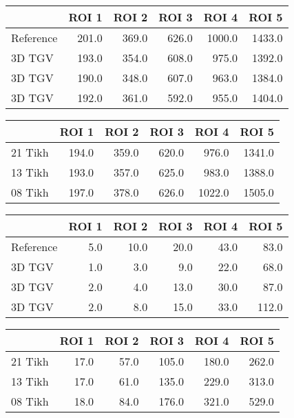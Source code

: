 \begin{tabular}{lrrrrr}
\toprule
{} &  ROI 1 &  ROI 2 &  ROI 3 &   ROI 4 &   ROI 5 \\
\midrule
Reference &  201.0 &  369.0 &  626.0 &  1000.0 &  1433.0 \\
3D TGV    &  193.0 &  354.0 &  608.0 &   975.0 &  1392.0 \\
3D TGV    &  190.0 &  348.0 &  607.0 &   963.0 &  1384.0 \\
3D TGV    &  192.0 &  361.0 &  592.0 &   955.0 &  1404.0 \\
\bottomrule
\end{tabular}
\begin{tabular}{lrrrrr}
\toprule
{} &  ROI 1 &  ROI 2 &  ROI 3 &   ROI 4 &   ROI 5 \\
\midrule
21 Tikh &  194.0 &  359.0 &  620.0 &   976.0 &  1341.0 \\
13 Tikh &  193.0 &  357.0 &  625.0 &   983.0 &  1388.0 \\
08 Tikh &  197.0 &  378.0 &  626.0 &  1022.0 &  1505.0 \\
\bottomrule
\end{tabular}
\begin{tabular}{lrrrrr}
\toprule
{} &  ROI 1 &  ROI 2 &  ROI 3 &  ROI 4 &  ROI 5 \\
\midrule
Reference &    5.0 &   10.0 &   20.0 &   43.0 &   83.0 \\
3D TGV    &    1.0 &    3.0 &    9.0 &   22.0 &   68.0 \\
3D TGV    &    2.0 &    4.0 &   13.0 &   30.0 &   87.0 \\
3D TGV    &    2.0 &    8.0 &   15.0 &   33.0 &  112.0 \\
\bottomrule
\end{tabular}
\begin{tabular}{lrrrrr}
\toprule
{} &  ROI 1 &  ROI 2 &  ROI 3 &  ROI 4 &  ROI 5 \\
\midrule
21 Tikh &   17.0 &   57.0 &  105.0 &  180.0 &  262.0 \\
13 Tikh &   17.0 &   61.0 &  135.0 &  229.0 &  313.0 \\
08 Tikh &   18.0 &   84.0 &  176.0 &  321.0 &  529.0 \\
\bottomrule
\end{tabular}
